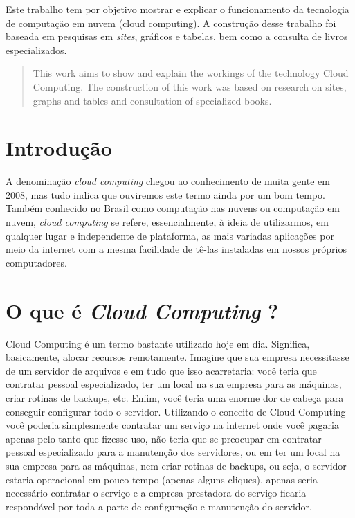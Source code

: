 \documentclass{abnt}
\begin{document}
	\capa
	
	\folhaderosto
	
	\begin{resumo}
		Este trabalho tem por objetivo mostrar e explicar o funcionamento da tecnologia de computação em nuvem (cloud computing). 
		A construção desse trabalho foi baseada em pesquisas em \textit{sites}, gráficos e tabelas, bem como a consulta de livros especializados.
	\end{resumo}

	\begin{abstract}
		This work aims to show and explain the workings of the technology Cloud Computing. The construction of this work was based on research on sites, graphs and tables and consultation of specialized books.
	\end{abstract}
	
	\sumario
	
	
	\listadefiguras
	
	\chapter{Introdução}
	
	A denominação \textit{cloud computing} chegou ao conhecimento de muita gente em 2008, 
	mas tudo indica que ouviremos este termo ainda por um bom tempo. Também conhecido no Brasil 
	como computação nas nuvens ou computação em nuvem, \textit{cloud computing} se refere, essencialmente, 
	à ideia de utilizarmos, em qualquer lugar e independente de plataforma, as mais variadas aplicações 
	por meio da internet com a mesma facilidade de tê-las instaladas em nossos próprios computadores.

	\chapter{O que é \textit{Cloud Computing} ?}

	Cloud Computing é um termo bastante utilizado hoje em dia. Significa, basicamente, 
	alocar recursos remotamente. Imagine que sua empresa necessitasse de um servidor de 
	arquivos e em tudo que isso acarretaria: você teria que contratar pessoal especializado, 
	ter um local na sua empresa para as máquinas, criar rotinas de backups, etc. 
	Enfim, você teria uma enorme dor de cabeça para conseguir configurar todo o servidor. 
	Utilizando o conceito de Cloud Computing você poderia simplesmente contratar um serviço na 
	internet onde você pagaria apenas pelo tanto que fizesse uso, não teria que se preocupar em 
	contratar pessoal especializado para a manutenção dos servidores, ou em ter um local na 
	sua empresa para as máquinas, nem criar rotinas de backups, ou seja, o servidor 
	estaria operacional em pouco tempo (apenas alguns cliques), apenas seria necessário 
	contratar o serviço e a empresa prestadora do serviço ficaria respondável por toda a 
	parte de configuração e manutenção do servidor.
\end{document}
